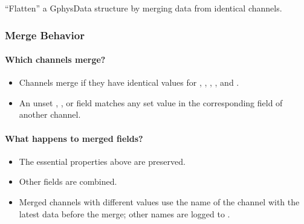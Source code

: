 \documentclass[letterpaper,11pt,english]{sphinxmanual}
\begin{document}
\begin{fulllineitems}
\end{fulllineitems}


“Flatten” a GphysData structure by merging data from identical channels.


\subsubsection{Merge Behavior}
\label{\detokenize{src/Processing/processing:merge-behavior}}

\paragraph{Which channels merge?}
\label{\detokenize{src/Processing/processing:which-channels-merge}}\begin{itemize}
\item {} 
Channels merge if they have identical values for , , , , and .

\item {} 
An unset , , or  field matches any set value in the corresponding field of another channel.

\end{itemize}


\paragraph{What happens to merged fields?}
\label{\detokenize{src/Processing/processing:what-happens-to-merged-fields}}\begin{itemize}
\item {} 
The essential properties above are preserved.

\item {} 
Other fields are combined.

\item {} 
Merged channels with different  values use the name of the channel with the latest data before the merge; other names are logged to .

\end{itemize}
\end{document}
